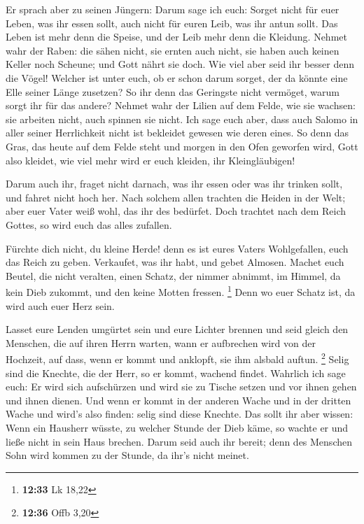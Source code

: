  Er sprach aber zu seinen Jüngern: Darum sage ich euch:
Sorget nicht für euer Leben, was ihr essen sollt, auch nicht für euren
Leib, was ihr antun sollt.  Das Leben ist mehr denn die
Speise, und der Leib mehr denn die Kleidung.  Nehmet wahr
der Raben: die sähen nicht, sie ernten auch nicht, sie haben auch keinen
Keller noch Scheune; und Gott nährt sie doch. Wie viel aber seid ihr
besser denn die Vögel!  Welcher ist unter euch, ob er
schon darum sorget, der da könnte eine Elle seiner Länge zusetzen?
 So ihr denn das Geringste nicht vermöget, warum sorgt
ihr für das andere?  Nehmet wahr der Lilien auf dem
Felde, wie sie wachsen: sie arbeiten nicht, auch spinnen sie nicht. Ich
sage euch aber, dass auch Salomo in aller seiner Herrlichkeit nicht ist
bekleidet gewesen wie deren eines.  So denn das Gras, das
heute auf dem Felde steht und morgen in den Ofen geworfen wird, Gott
also kleidet, wie viel mehr wird er euch kleiden, ihr Kleingläubigen!

 Darum auch ihr, fraget nicht darnach, was ihr essen oder
was ihr trinken sollt, und fahret nicht hoch her.  Nach
solchem allen trachten die Heiden in der Welt; aber euer Vater weiß
wohl, das ihr des bedürfet.  Doch trachtet nach dem Reich
Gottes, so wird euch das alles zufallen.

 Fürchte dich nicht, du kleine Herde! denn es ist eures
Vaters Wohlgefallen, euch das Reich zu geben.  Verkaufet,
was ihr habt, und gebet Almosen. Machet euch Beutel, die nicht veralten,
einen Schatz, der nimmer abnimmt, im Himmel, da kein Dieb zukommt, und
den keine Motten fressen. \footnote{\textbf{12:33} Lk 18,22}
 Denn wo euer Schatz ist, da wird auch euer Herz sein.

 Lasset eure Lenden umgürtet sein und eure Lichter
brennen  und seid gleich den Menschen, die auf ihren
Herrn warten, wann er aufbrechen wird von der Hochzeit, auf dass, wenn
er kommt und anklopft, sie ihm alsbald auftun. \footnote{\textbf{12:36}
  Offb 3,20}  Selig sind die Knechte, die der Herr, so er
kommt, wachend findet. Wahrlich ich sage euch: Er wird sich aufschürzen
und wird sie zu Tische setzen und vor ihnen gehen und ihnen dienen.
 Und wenn er kommt in der anderen Wache und in der
dritten Wache und wird's also finden: selig sind diese Knechte.
 Das sollt ihr aber wissen: Wenn ein Hausherr wüsste, zu
welcher Stunde der Dieb käme, so wachte er und ließe nicht in sein Haus
brechen.  Darum seid auch ihr bereit; denn des Menschen
Sohn wird kommen zu der Stunde, da ihr's nicht meinet.

